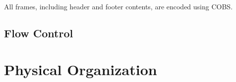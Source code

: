 \documentclass[11pt]{article}
\newcommand{\nanoarq}{\texttt{nanoarq}}
\begin{document}
\begin{comment}
    Version & \nanoarq{} protocol version \\
    Reserved & Unused, must be zero-filled. \\
    RST & Reset flag \\
    ACK & Acknowledgement flag \\
    FIN & Close flag \\
    Payload Size & Size, in bytes, of current frame's data \\
    Window Size & Available size, in segments, of sender's receive window \\
    Sequence Number & Sequence number, in bytes, of this segment \\
    Segment ID & Bitfield indicating which sub-segment frame the current payload contains \\
    ACK Number & Sequence number, in bytes, of the last fully- or partially-received segment \\
    ACK Segment ID & Bitfield indicating which frames in the ACK segment have been successfully received \\
    Checksum & Sender-computed value for validating frame integrity \\
\end{comment}

All frames, including header and footer contents, are encoded using COBS.
\subsection{Flow Control}

\section{Physical Organization}
\end{document}
